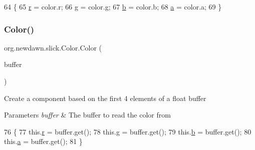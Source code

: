 \begin{DoxyCode}
64                               \{
65         \mbox{\hyperlink{classorg_1_1newdawn_1_1slick_1_1_color_ac07fa95108064b044dcf9a53e95dcb48}{r}} = color.r;
66         \mbox{\hyperlink{classorg_1_1newdawn_1_1slick_1_1_color_aa6ebff7c102a1476e7b511a78397b753}{g}} = color.g;
67         \mbox{\hyperlink{classorg_1_1newdawn_1_1slick_1_1_color_a8c0cef152e16438fee852a97e50ef7a5}{b}} = color.b;
68         \mbox{\hyperlink{classorg_1_1newdawn_1_1slick_1_1_color_ab9288c822ff7614a77c887eb8c2595a7}{a}} = color.a;
69     \}
\end{DoxyCode}
\mbox{\label{classorg_1_1newdawn_1_1slick_1_1_color_a6633f5b5d498edeb6adda17197dd981b}} 
\subsubsection{\texorpdfstring{Color()}{Color()}\hspace{0.1cm}{\footnotesize\ttfamily [2/7]}}
{\footnotesize\ttfamily org.\+newdawn.\+slick.\+Color.\+Color (\begin{DoxyParamCaption}\item[{Float\+Buffer}]{buffer }\end{DoxyParamCaption})\hspace{0.3cm}{\ttfamily [inline]}}

Create a component based on the first 4 elements of a float buffer


\begin{DoxyParams}{Parameters}
{\em buffer} & The buffer to read the color from \\
\hline
\end{DoxyParams}

\begin{DoxyCode}
76                                      \{
77         this.\mbox{\hyperlink{classorg_1_1newdawn_1_1slick_1_1_color_ac07fa95108064b044dcf9a53e95dcb48}{r}} = buffer.get();
78         this.\mbox{\hyperlink{classorg_1_1newdawn_1_1slick_1_1_color_aa6ebff7c102a1476e7b511a78397b753}{g}} = buffer.get();
79         this.\mbox{\hyperlink{classorg_1_1newdawn_1_1slick_1_1_color_a8c0cef152e16438fee852a97e50ef7a5}{b}} = buffer.get();
80         this.\mbox{\hyperlink{classorg_1_1newdawn_1_1slick_1_1_color_ab9288c822ff7614a77c887eb8c2595a7}{a}} = buffer.get();
81     \}
\end{DoxyCode}
\mbox{\label{classorg_1_1newdawn_1_1slick_1_1_color_a844d444c9633cc3142f6e7184194ae3e}} 
